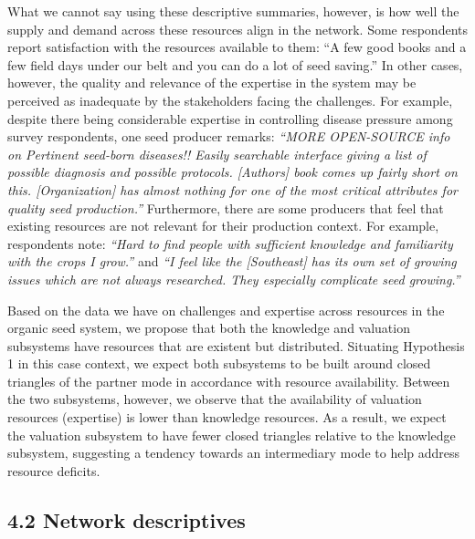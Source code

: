\documentclass[twoside,12pt,final]{ucthesis-CA2012}
\begin{document}
\begin{ucmainmatter}
What we cannot say using these descriptive summaries, however, is how
well the supply and demand across these resources align in the network.
Some respondents report satisfaction with the resources available to
them: ``A few good books and a few field days under our belt and you can
do a lot of seed saving.'' In other cases, however, the quality and
relevance of the expertise in the system may be perceived as inadequate
by the stakeholders facing the challenges. For example, despite there
being considerable expertise in controlling disease pressure among
survey respondents, one seed producer remarks: \emph{``MORE OPEN-SOURCE info
on Pertinent seed-born diseases!! Easily searchable interface giving a
list of possible diagnosis and possible protocols. {[}Author\textquotesingle s{]} book
comes up fairly short on this. {[}Organization{]} has almost nothing for
one of the most critical attributes for quality seed production.''}
Furthermore, there are some producers that feel that existing resources
are not relevant for their production context. For example, respondents
note: \emph{``Hard to find people with sufficient knowledge and familiarity
with the crops I grow.''} and \emph{``I feel like the {[}Southeast{]} has its
own set of growing issues which are not always researched. They
especially complicate seed growing.''}

Based on the data we have on challenges and expertise across resources
in the organic seed system, we propose that both the knowledge and
valuation subsystems have resources that are existent but distributed.
Situating Hypothesis 1 in this case context, we expect both subsystems
to be built around closed triangles of the partner mode in accordance
with resource availability. Between the two subsystems, however, we
observe that the availability of valuation resources (expertise) is
lower than knowledge resources. As a result, we expect the valuation
subsystem to have fewer closed triangles relative to the knowledge
subsystem, suggesting a tendency towards an intermediary mode to help
address resource deficits.

\hypertarget{network-descriptives}{%
\subsection{4.2 Network descriptives}\label{network-descriptives}}


\end{ucmainmatter}
\end{document}
